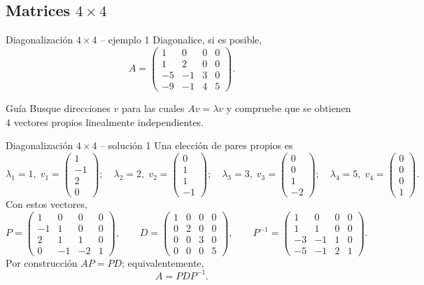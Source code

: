 \documentclass[aspectratio=169,10pt]{beamer}
\begin{document}
\subsection{Matrices $4\times 4$}
\begin{frame}{Diagonalización $4\times 4$ -- ejemplo 1}
\small
Diagonalice, si es posible,
\[
A=\begin{pmatrix}1 & 0 & 0 & 0\\1 & 2 & 0 & 0\\-5 & -1 & 3 & 0\\-9 & -1 & 4 & 5\end{pmatrix}.
\]
\begin{block}{Guía}
Busque direcciones $v$ para las cuales $Av=\lambda v$ y compruebe que se obtienen $4$ vectores propios linealmente independientes.
\end{block}
\end{frame}
\begin{frame}{Diagonalización $4\times 4$ -- solución 1}
\scriptsize
Una elección de pares propios es
\[
\lambda_1=1,\;v_1=\begin{pmatrix}1\\-1\\2\\0\end{pmatrix};\quad \lambda_2=2,\;v_2=\begin{pmatrix}0\\1\\1\\-1\end{pmatrix};\quad \lambda_3=3,\;v_3=\begin{pmatrix}0\\0\\1\\-2\end{pmatrix};\quad \lambda_4=5,\;v_4=\begin{pmatrix}0\\0\\0\\1\end{pmatrix}.
\]
Con estos vectores,
\[
P=\begin{pmatrix}1 & 0 & 0 & 0\\-1 & 1 & 0 & 0\\2 & 1 & 1 & 0\\0 & -1 & -2 & 1\end{pmatrix},\qquad D=\begin{pmatrix}1 & 0 & 0 & 0\\0 & 2 & 0 & 0\\0 & 0 & 3 & 0\\0 & 0 & 0 & 5\end{pmatrix},\qquad P^{-1}=\begin{pmatrix}1 & 0 & 0 & 0\\1 & 1 & 0 & 0\\-3 & -1 & 1 & 0\\-5 & -1 & 2 & 1\end{pmatrix}.
\]
Por construcción $AP=PD$; equivalentemente,
\[
\boxed{A=PDP^{-1}}.
\]
\end{frame}
\end{document}
